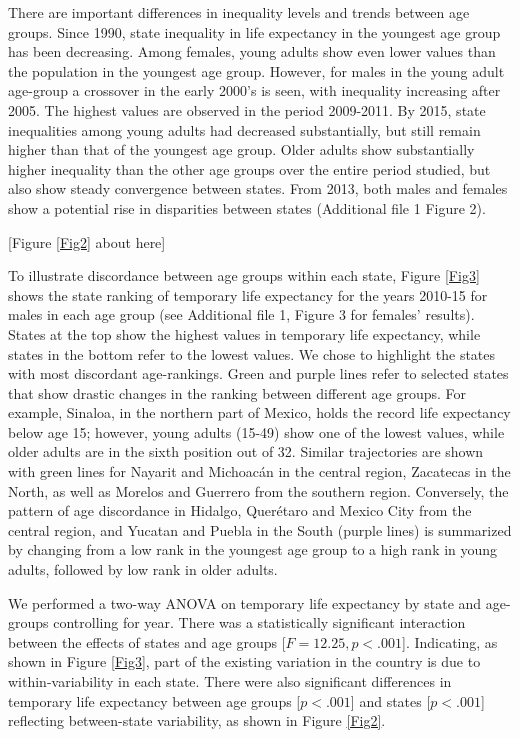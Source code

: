 \documentclass{bmcart}
\begin{document}
There are important differences in inequality levels and trends between age groups. Since 1990, state inequality in life expectancy in the youngest age group has been decreasing. Among females, young adults show even lower values than the population in the youngest age group. However, for males in the young adult age-group a crossover in the early 2000's is seen, with inequality increasing after 2005. The highest values are observed in the period 2009-2011. By 2015, state inequalities among young adults had decreased substantially, but still remain higher than that of the youngest age group. Older adults show substantially higher inequality than the other age groups over the entire period studied, but also show steady convergence between states. From 2013, both males and females show a potential rise in disparities between states (Additional file 1 Figure 2).  \\

\begin{center}
[Figure \ref{Fig2} about here]
\end{center}


To illustrate discordance between age groups within each state, Figure \ref{Fig3} shows the state ranking of temporary life expectancy for the years 2010-15 for males in each age group (see Additional file 1, Figure 3 for females' results). States at the top show the highest values in temporary life expectancy, while states in the bottom refer to the lowest values. We chose to highlight the states with most discordant age-rankings. Green and purple lines refer to selected states that show drastic changes in the ranking between different age groups. For example, Sinaloa, in the northern part of Mexico, holds the record life expectancy below age 15; however, young adults (15-49) show one of the lowest values, while older adults are in the sixth position out of 32. Similar trajectories are shown with green lines for Nayarit and Michoac\'an in the central region, Zacatecas in the North, as well as Morelos and Guerrero from the southern region. Conversely, the pattern of age discordance in Hidalgo, Quer\'etaro and Mexico City from the central region, and Yucatan and Puebla in the South (purple lines) is summarized by changing from a low rank in the youngest age group to a high rank in young adults, followed by low rank in older adults. 

We performed a two-way ANOVA on temporary life expectancy by state and age-groups controlling for year. There was a statistically significant interaction between the effects of states and age groups [$F=12.25, p < .001$]. Indicating, as shown in Figure \ref{Fig3}, part of the existing variation in the country is due to within-variability in each state. There were also significant differences in temporary life expectancy between age groups [$p < .001$] and states [$p < .001$] reflecting between-state variability, as shown in Figure \ref{Fig2}.\\
\end{document}
